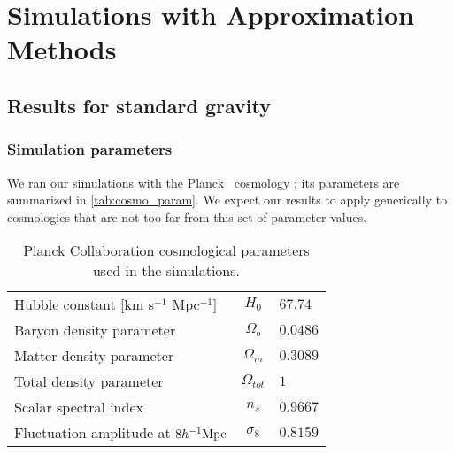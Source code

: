\chapter{Simulations with Approximation Methods}
\label{chpt:app_sims}

\section{Results for standard gravity}

\subsection{Simulation parameters}
We ran our simulations with the Planck \LCDM\ cosmology \parencite{planck_cosm}; its parameters are summarized in \autoref{tab:cosmo_param}. We expect our results to apply generically to cosmologies that are not too far from this set of parameter values.

\begin{table}
\begin{tabular}{ l c l }
  \hline \hline
  Hubble constant  [km s$^{-1}$ Mpc$^{-1}$] & $H_0$ & $67.74$ \\
  Baryon density parameter & $\Omega_b$ & $0.0486$ \\
  Matter density parameter & $\Omega_m$ & $0.3089$ \\
  Total density parameter & $\Omega_{tot}$ & $1$ \\
  Scalar spectral index & $n_s$ & $0.9667$ \\
  Fluctuation amplitude at $8h^{-1}\text{Mpc}$ & $\sigma_8$ & $0.8159$ \\
  \hline \hline
\end{tabular}
\caption{Planck Collaboration cosmological parameters \parencite{planck_cosm} used in the simulations.}
\label{tab:cosmo_param}
\end{table}








